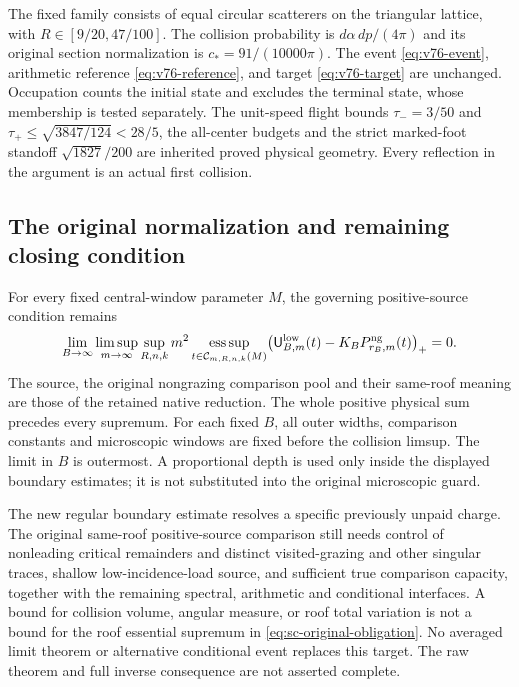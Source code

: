 \documentclass[11pt,reqno]{amsart}
\numberwithin{equation}{section}
\theoremstyle{definition}\newtheorem{definition}[theorem]{Definition}
\theoremstyle{remark}\newtheorem{remark}[theorem]{Remark}
\begin{document}
The fixed family consists of equal circular scatterers on the
triangular lattice, with $R\in[9/20,47/100]$. The collision probability
is $d\alpha\,dp/(4\pi)$ and its original section normalization is
$c_*=91/(10000\pi)$. The event \eqref{eq:v76-event}, arithmetic
reference \eqref{eq:v76-reference}, and target \eqref{eq:v76-target}
are unchanged. Occupation counts the initial state and excludes
the terminal state, whose membership is tested separately.
The unit-speed flight bounds
$\tau_-=3/50$ and $\tau_+\le\sqrt{3847/124}<28/5$, the all-center
budgets and the strict marked-foot standoff $\sqrt{1827}/200$
are inherited proved physical geometry. Every reflection in the
argument is an actual first collision.



\subsection*{The original normalization and remaining closing condition}
For every fixed central-window parameter $M$, the governing
positive-source condition remains
\begin{equation}\label{eq:sc-original-obligation}
 \lim_{B\to\infty}\limsup_{m\to\infty}\sup_{R,n,k}
 m^2\operatorname*{ess\,sup}_{t\in\mathcal C_{m,R,n,k}(M)}
 \bigl(\mathsf U^{\rm low}_{B,m}(t)
                    -K_BP^{\rm ng}_{r_B,m}(t)\bigr)_+=0.
\end{equation}
The source, the original nongrazing comparison pool and their
same-roof meaning are those of the retained native reduction.
The whole positive physical sum precedes every supremum.
For each fixed $B$, all outer widths, comparison constants and
microscopic windows are fixed before the collision limsup.
The limit in $B$ is outermost. A proportional depth is used only
inside the displayed boundary estimates; it is not substituted into
the original microscopic guard.

The new regular boundary estimate resolves a specific previously
unpaid charge. The original same-roof positive-source comparison
still needs control of nonleading critical remainders and distinct
visited-grazing and other singular traces,
shallow low-incidence-load source, and sufficient true comparison
capacity, together with the remaining spectral, arithmetic and
conditional interfaces. A bound for collision volume, angular
measure, or roof total variation is not a bound for the roof
essential supremum in \eqref{eq:sc-original-obligation}.
No averaged limit theorem or alternative conditional event replaces
this target. The raw theorem and full inverse consequence are not
asserted complete.
\end{document}

